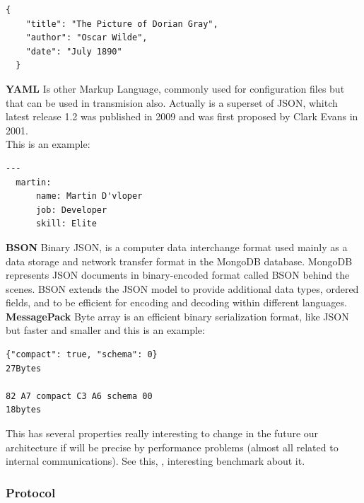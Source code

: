 \begin{lstlisting}[frame=none,numbers=none]
  {
    "title": "The Picture of Dorian Gray",
    "author": "Oscar Wilde",
    "date": "July 1890"
  }
\end{lstlisting}


\noindent \textbf{YAML}
\intro
Is other Markup Language, commonly used for configuration files but that can
be used in transmision also. Actually is a superset of JSON, whitch latest release
1.2 was published in 2009 and was first proposed by Clark Evans in 2001.
\\This is an example:

\begin{lstlisting}[frame=none,numbers=none]
  ---
  martin:
      name: Martin D'vloper
      job: Developer
      skill: Elite
\end{lstlisting}


\noindent \textbf{BSON}
\intro
Binary JSON, is a computer data interchange format used mainly as a data storage
and network transfer format in the MongoDB database.
MongoDB represents JSON documents in binary-encoded format called BSON behind
the scenes. BSON extends the JSON model to provide additional data types,
ordered fields, and to be efficient for encoding and decoding within different languages.
\intro
\noindent \textbf{MessagePack}
\intro
Byte array is an efficient binary serialization format, like JSON but faster and smaller and this is an example:

\begin{lstlisting}[frame=none,numbers=none]
{"compact": true, "schema": 0}
27Bytes

82 A7 compact C3 A6 schema 00
18bytes
\end{lstlisting}

\noindent This has several properties really interesting to change in the future
our architecture if will be precise by performance problems (almost all related to internal communications).
See this, \cite{comparision}, interesting benchmark about it.

\subsubsection{Protocol}

